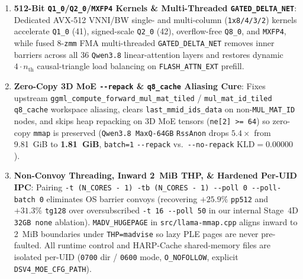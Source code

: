 \documentclass[10pt,twocolumn]{article}
\begin{document}
\begin{enumerate}
    \item \textbf{512-Bit \texttt{Q1\_0}/\texttt{Q2\_0}/\texttt{MXFP4} Kernels \& Multi-Threaded \texttt{GATED\_DELTA\_NET}}: Dedicated AVX-512 VNNI/BW single- and multi-column (\texttt{1x8/4/3/2}) kernels accelerate \texttt{Q1\_0} (41), signed-scale \texttt{Q2\_0} (42), overflow-free \texttt{Q8\_0}, and \texttt{MXFP4}, while fused 8-\texttt{zmm} FMA multi-threaded \texttt{GATED\_DELTA\_NET} removes inner barriers across all 36 \texttt{Qwen3.8} linear-attention layers and restores dynamic $4\cdot n_{\text{th}}$ causal-triangle load balancing on \texttt{FLASH\_ATTN\_EXT} prefill.
    \item \textbf{Zero-Copy 3D MoE \texttt{{-}{-}repack} \& \texttt{q8\_cache} Aliasing Cure}: Fixes upstream \texttt{ggml\_compute\_forward\_mul\_mat\_tiled} / \texttt{mul\_mat\_id\_tiled} \texttt{q8\_cache} workspace aliasing, clears \texttt{last\_mmid\_ids\_data} on non-\texttt{MUL\_MAT\_ID} nodes, and skips heap repacking on 3D MoE tensors (\texttt{ne[2] >= 64}) so zero-copy \texttt{mmap} is preserved (\texttt{Qwen3.8 MaxQ-64GB} \texttt{RssAnon} drops $5.4\times$ from 9.81~GiB to \textbf{1.81~GiB}, \texttt{batch=1} \texttt{{-}{-}repack} vs.\ \texttt{{-}{-}no-repack} $\text{KLD}=0.00000$).
    \item \textbf{Non-Convoy Threading, Inward 2~MiB THP, \& Hardened Per-UID IPC}: Pairing \texttt{-t (N\_CORES - 1) -tb (N\_CORES - 1) {-}{-}poll 0 {-}{-}poll-batch 0} eliminates OS barrier convoys (recovering $+25.9\%$ \texttt{pp512} and $+31.3\%$ \texttt{tg128} over oversubscribed \texttt{-t 16 {-}{-}poll 50} in our internal Stage~4D \texttt{32GB none} ablation). \texttt{MADV\_HUGEPAGE} in \texttt{src/llama-mmap.cpp} aligns inward to 2~MiB boundaries under \texttt{THP=madvise} so lazy PLE pages are never pre-faulted. All runtime control and HARP-Cache shared-memory files are isolated per-UID (\texttt{0700} dir / \texttt{0600} mode, \texttt{O\_NOFOLLOW}, explicit \texttt{DSV4\_MOE\_CFG\_PATH}).

\end{enumerate}
\end{document}
